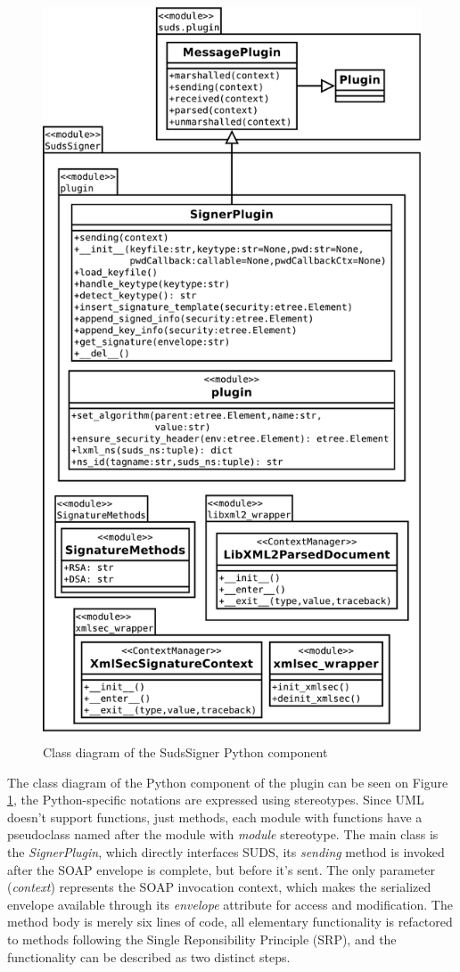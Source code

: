 \begin{figure}[htbp]
 \centering
 \includegraphics[height=22cm]{images/clsdSudsSigner.pdf}
 \caption{Class diagram of the SudsSigner Python component}
 \label{fig:clsdSudsSigner}
\end{figure}

The class diagram of the Python component of the plugin can be seen on Figure \ref{fig:clsdSudsSigner}, the Python-specific notations are expressed using stereotypes. Since UML doesn't support functions, just methods, each module with functions have a pseudoclass named after the module with \emph{module} stereotype. The main class is the \emph{SignerPlugin}, which directly interfaces SUDS, its \emph{sending} method is invoked after the SOAP envelope is complete, but before it's sent. The only parameter (\emph{context}) represents the SOAP invocation context, which makes the serialized envelope available through its \emph{envelope} attribute for access and modification. The method body is merely six lines of code, all elementary functionality is refactored to methods following the Single Reponsibility Principle (SRP), and the functionality can be described as two distinct steps.

